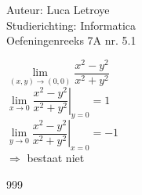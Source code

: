 \documentclass[a4paper]{article}
\begin{document}
  
\noindent \large Auteur: Luca Letroye \\
\noindent \large Studierichting: Informatica\\
\noindent \large Oefeningenreeks 7A nr. 5.1\\

\medskip
\normalsize

$\lim\limits_{(x,y)\rightarrow(0,0)} \dfrac{x^2-y^2}{x^2+y^2}$\\

$\left. \lim\limits_{x\rightarrow0} \dfrac{x^2-y^2}{x^2+y^2}\right|_{y=0} = 1$\\

$\left. \lim\limits_{y\rightarrow0} \dfrac{x^2-y^2}{x^2+y^2}\right|_{x=0} = -1$\\

$\Rightarrow $ bestaat niet \\






\begin{thebibliography}{999}
\end{thebibliography}
\end{document}
